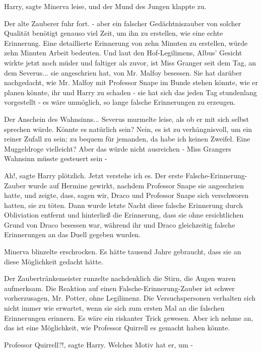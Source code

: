 \glqq{}Harry\grqq{}, sagte Minerva leise, und der Mund des Jungen klappte zu.

Der alte Zauberer fuhr fort. \glqq{}- aber ein falscher Gedächtniszauber von
solcher Qualität benötigt genauso viel Zeit, um ihn zu erstellen, wie eine echte
Erinnerung. Eine detaillierte Erinnerung von zehn Minuten zu erstellen, würde
zehn Minuten Arbeit bedeuten. Und laut den Hof-Legilimens\grqq{}, Albus' Gesicht
wirkte jetzt noch müder und faltiger als zuvor, \glqq{}ist Miss Granger seit dem
Tag, an dem Severus... sie angeschrien hat, von Mr. Malfoy besessen. Sie hat
darüber nachgedacht, wie Mr. Malfoy mit Professor Snape im Bunde stehen könnte,
wie er planen könnte, ihr und Harry zu schaden - sie hat sich das jeden Tag
stundenlang vorgestellt - es wäre unmöglich, so lange falsche Erinnerungen zu
erzeugen.\grqq{}

\glqq{}Der Anschein des Wahnsinns...\grqq{} Severus murmelte leise, als ob er mit
sich selbst sprechen würde. \glqq{}Könnte es natürlich sein? Nein, es ist zu
verhängnisvoll, um ein reiner Zufall zu sein; zu bequem für jemanden, da habe
ich keinen Zweifel. Eine Muggeldroge vielleicht? Aber das würde nicht ausreichen
- Miss Grangers Wahnsinn müsste gesteuert sein -\grqq{}

\glqq{}Ah!\grqq{}, sagte Harry plötzlich. \glqq{}Jetzt verstehe ich es. Der erste
Falsche-Erinnerung-Zauber wurde auf Hermine gewirkt, nachdem Professor Snape sie
angeschrien hatte, und zeigte, dass, sagen wir, Draco und Professor Snape sich
verschworen hatten, sie zu töten. Dann wurde letzte Nacht diese falsche
Erinnerung durch Obliviation entfernt und hinterließ die Erinnerung, dass sie
ohne ersichtlichen Grund von Draco besessen war, während ihr und Draco
gleichzeitig falsche Erinnerungen an das Duell gegeben wurden.\grqq{}

Minerva blinzelte erschrocken. Es hätte tausend Jahre gebraucht, dass sie an
diese Möglichkeit gedacht hätte.

Der Zaubertränkemeister runzelte nachdenklich die Stirn, die Augen waren
aufmerksam. \glqq{}Die Reaktion auf einen Falsche-Erinnerung-Zauber ist schwer
vorherzusagen, Mr. Potter, ohne Legilimenz. Die Versuchspersonen verhalten sich
nicht immer wie erwartet, wenn sie sich zum ersten Mal an die falschen
Erinnerungen erinnern. Es wäre ein riskanter Trick gewesen. Aber ich nehme an,
das ist eine Möglichkeit, wie Professor Quirrell es gemacht haben könnte.\grqq{}

\glqq{}Professor Quirrell?!\grqq{}, sagte Harry. \glqq{}Welches Motiv hat er, um
-\grqq{}

